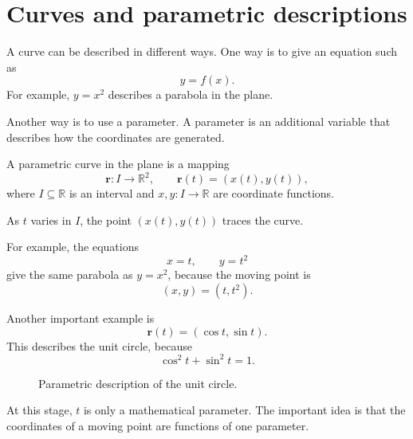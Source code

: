 \section{Curves and parametric descriptions}

A curve can be described in different ways. One way is to give an equation such as
\[
y=f(x).
\]
For example, \(y=x^2\) describes a parabola in the plane.

Another way is to use a parameter. A parameter is an additional variable that describes how the coordinates are generated.

\begin{definitionbox}
A parametric curve in the plane is a mapping
\[
\mathbf{r}\colon I\to\mathbb{R}^2,
\qquad
\mathbf{r}(t)=(x(t),y(t)),
\]
where \(I\subseteq\mathbb{R}\) is an interval and \(x,y\colon I\to\mathbb{R}\) are coordinate functions.
\end{definitionbox}

As \(t\) varies in \(I\), the point \((x(t),y(t))\) traces the curve.

For example, the equations
\[
x=t, \qquad y=t^2
\]
give the same parabola as \(y=x^2\), because the moving point is
\[
(x,y)=(t,t^2).
\]

Another important example is
\[
\mathbf{r}(t)=(\cos t,\sin t).
\]
This describes the unit circle, because
\[
\cos^2 t+\sin^2 t=1.
\]

\begin{figure}[htbp]
\centering

\caption{Parametric description of the unit circle.}
\label{fig:mathematical-foundations-parametric-unit-circle}
\end{figure}

\begin{remarkbox}
At this stage, \(t\) is only a mathematical parameter. The important idea is that the coordinates of a moving point are functions of one parameter.
\end{remarkbox}
